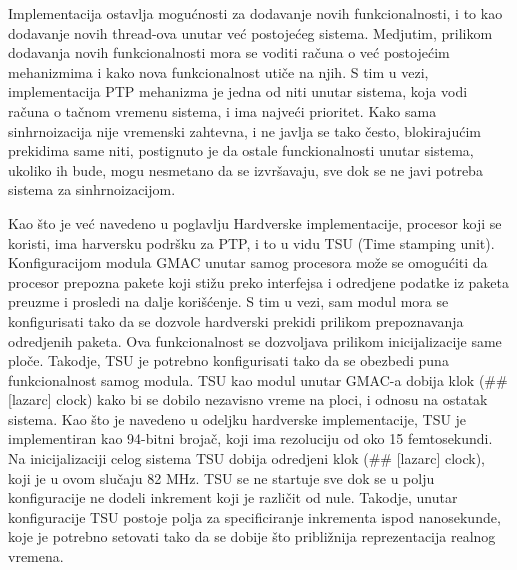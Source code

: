 \documentclass[a4paper,12pt, master]{etf}
\begin{document}
        Implementacija ostavlja mogu\'{c}nosti za dodavanje novih
        funkcionalnosti, i to kao dodavanje novih thread-ova
        unutar ve\'{c} postoje\'{c}eg sistema. Medjutim, prilikom dodavanja
        novih funkcionalnosti mora se voditi ra\v{c}una o
        ve\'{c} postoje\'{c}im mehanizmima i kako nova funkcionalnost uti\v{c}e
        na njih. S tim u vezi, implementacija PTP mehanizma je jedna od niti
        unutar sistema, koja vodi ra\v{c}una o ta\v{c}nom vremenu sistema, i
        ima najve\'{c}i prioritet. Kako sama sinhrnoizacija nije vremenski
        zahtevna, i ne javlja se tako \v{c}esto, blokiraju\'{c}im prekidima
        same niti, postignuto je da ostale funckionalnosti unutar sistema,
        ukoliko ih bude, mogu nesmetano da se izvr\v{s}avaju, sve dok se ne
        javi potreba sistema za sinhrnoizacijom.

        Kao \v{s}to je ve\'{c} navedeno u poglavlju Hardverske implementacije,
        procesor koji se koristi, ima harversku podr\v{s}ku za PTP, i to u vidu
        TSU (Time stamping unit). Konfiguracijom modula GMAC unutar samog
        procesora mo\v{z}e se omogu\'{c}iti da procesor prepozna pakete koji
        sti\v{z}u preko interfejsa i odredjene podatke iz paketa preuzme i
        prosledi na dalje kori\v{s}\'{c}enje. S tim u vezi, sam modul mora se
        konfigurisati tako da se dozvole hardverski prekidi prilikom
        prepoznavanja odredjenih paketa. Ova funkcionalnost se dozvoljava
        prilikom inicijalizacije same plo\v{c}e. Takodje, TSU je potrebno
        konfigurisati tako da se obezbedi puna funkcionalnost samog modula. TSU
        kao modul unutar GMAC-a dobija klok (\#\# [lazarc] clock) kako bi se
        dobilo nezavisno vreme na ploci, i odnosu na ostatak sistema. Kao
        \v{s}to je navedeno u odeljku hardverske implementacije, TSU je
        implementiran kao 94-bitni broja\v{c}, koji ima rezoluciju od oko 15
        femtosekundi. Na inicijalizaciji celog sistema TSU dobija odredjeni
        klok (\#\# [lazarc] clock), koji je u ovom slu\v{c}aju 82 MHz. TSU se
        ne startuje sve dok se u polju konfiguracije ne dodeli inkrement koji
        je razli\v{c}it od nule. Takodje, unutar konfiguracije TSU postoje
        polja za specificiranje inkrementa ispod nanosekunde, koje je potrebno
        setovati tako da se dobije \v{s}to pribli\v{z}nija reprezentacija
        realnog vremena.
\end{document}
